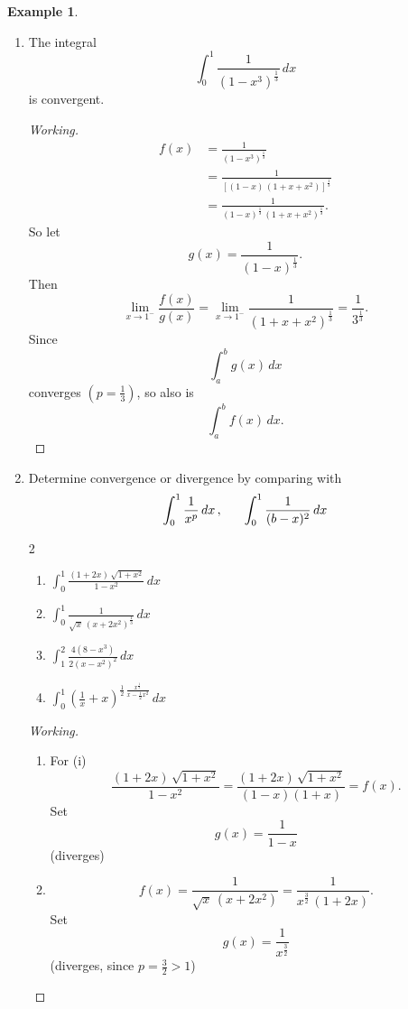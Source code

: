 \documentclass[12pt,a4paper]{report}
\theoremstyle{definition}
\newtheorem{exa}[thm]{Example}
\theoremstyle{plain}
\begin{document}
\begin{exa}\textbf{}
\begin{enumerate}
\item[(a).] The integral $$\int_0^1\frac{1}{(1 - x^3)^{\frac{1}{3}}}\, dx$$ is convergent.
\begin{proof}[Working]
\begin{align*}
f(x) & = \frac{1}{(1 - x^3)^{\frac{1}{3}}}\\
     & = \frac{1}{\left[(1 - x)\, (1 + x + x^2)\right]^{\frac{1}{3}}}\\
     & = \frac{1}{(1 - x)^{\frac{1}{3}}\, (1 + x + x^2)^{\frac{1}{3}}}.
\end{align*}
So let $$g(x) = \frac{1}{(1 - x)^{\frac{1}{3}}}.$$ Then
$$\lim_{x\rightarrow 1^-} \frac{f(x)}{g(x)} = \lim_{x\rightarrow 1^-} \frac{1}{(1 + x + x^2)^{\frac{1}{3}}} = \frac{1}{3^{\frac{1}{3}}}.$$
Since $$\int_a^bg(x)\, dx$$ converges $(p = \frac{1}{3})$, so also is $$\int_a^bf(x)\, dx.$$
\end{proof}

\item[(b).] Determine convergence or divergence by comparing with 
$$\int_0^1\frac{1}{x^p}\, dx \, , \hspace{0.6cm} \int_0^1\frac{1}{(b - x)^2}\, dx$$

\vspace{5pt}
\begin{multicols}{2}
\begin{enumerate}
\item[(i).] $\displaystyle{\int_0^1 \frac{(1 + 2x)\, \sqrt{1 + x^2}}{1 - x^2}}\, dx$
\item[(ii).] $\displaystyle{\int_0^1 \frac{1}{\sqrt{x}\, (x + 2x^2)^{\frac{1}{3}}}}\, dx$
\item[(iii).] $\displaystyle{\int_1^2\frac{4(8 - x^3)}{2(x - x^2)^2}}\, dx$
\item[(iv).] $\displaystyle{\int_0^1\left(\frac{1}{x} + x\right)^{\frac{1}{2}\,\frac{x^{\frac{1}{3}}}{x - \frac{1}{2}x^2}}}\, dx$
\end{enumerate}
\end{multicols}

\begin{proof}[Working]\textbf{}
\begin{enumerate}
\item[(i).] For (i) $$\frac{(1 + 2x)\, \sqrt{1 + x^2}}{1 - x^2} = \frac{(1 + 2x) \, \sqrt{1 + x^2}}{(1 - x)(1 + x)} = f(x).$$ Set $$g(x) = \frac{1}{1 - x}$$  (diverges)

\item[(ii).] $$f(x) = \frac{1}{\sqrt{x}\, (x + 2x^2)} = \frac{1}{x^{\frac{3}{2}}\, (1 + 2x)}.$$ Set $$g(x) = \frac{1}{x^{\frac{3}{2}}}$$  (diverges, since $p = \frac{3}{2} >1$)


\end{enumerate}
\end{proof}
\end{enumerate}
\end{exa}
\end{document}
